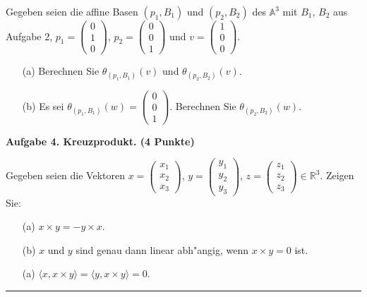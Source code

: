 \documentclass[a4paper,12pt]{scrartcl}
\newcommand{\RR}{\mathbb{R}}
\begin{document}
Gegeben seien die affine Basen $(p_1, B_1)$ und $(p_2, B_2)$ des $\mathbb{A}^3$ mit
$B_1$, $B_2$ aus Aufgabe 2, $p_1 = \begin{pmatrix} 0 \\  1 \\ 0 \end{pmatrix}$,  $p_2 = \begin{pmatrix} 0 \\  0 \\ 1 \end{pmatrix}$ und $v= \begin{pmatrix} 1 \\  0 \\ 0 \end{pmatrix}$. 
\begin{itemize}\itemsep0pt
\item[(a)] Berechnen Sie $\theta_{(p_1, B_1)} (v)$ und  $\theta_{(p_2, B_2)}(v)$.
\item[(b)] Es sei $\theta_{(p_1, B_1)} (w) = \begin{pmatrix} 0 \\  0 \\ 1 \end{pmatrix}$. Berechnen Sie   $\theta_{(p_2, B_2)} (w)$.
\end{itemize}



\vspace*{4mm}


{\bf Aufgabe 4. Kreuzprodukt. \hfill (4 Punkte)}

Gegeben seien die Vektoren 
$x=\begin{pmatrix} x_1\\ x_2\\ x_3 \end{pmatrix}$, $y=\begin{pmatrix} y_1\\ y_2\\ y_3 \end{pmatrix}$,  $z=\begin{pmatrix} z_1\\ z_2\\ z_3 \end{pmatrix} \in\RR^3$. Zeigen Sie:
\begin{itemize}
\item [(a)] $x  \times y = -y\times x$.
\item[(b)]
$x$ und $y$ sind genau dann linear abh"angig, wenn $x\times y=0$ ist. 
\item[(a)] $\langle x, x \times y \rangle = \langle y, x\times y \rangle = 0$.  
\end{itemize}

\vspace*{4mm}

\vfill

\hrule
\end{document}
